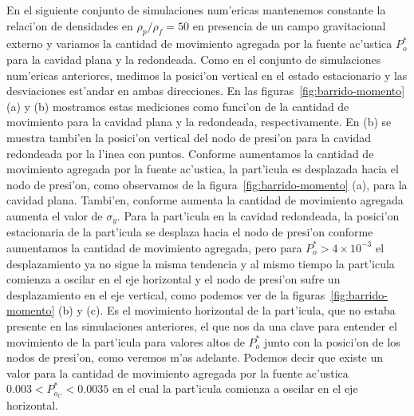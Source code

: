 En el siguiente conjunto de simulaciones num'ericas mantenemos constante la
relaci'on de densidades en  $\rho_p/\rho_f=50$  en presencia de un campo
gravitacional externo y variamos la cantidad de movimiento
agregada por la fuente ac'ustica $P_o^\ast$  para la cavidad plana y
la redondeada. Como en el conjunto de simulaciones num'ericas anteriores, medimos
la posici'on vertical en el estado estacionario y las desviaciones est'andar en ambas direcciones.
En las figuras~\ref{fig:barrido-momento} (a) y (b) mostramos estas mediciones 
como funci'on de la cantidad de movimiento para la cavidad plana y la redondeada, respectivamente. 
En (b) se muestra tambi'en la posici'on vertical del nodo de presi'on para la cavidad redondeada
por la l'inea con puntos. Conforme aumentamos la cantidad de movimiento agregada 
por la fuente ac'ustica, la part'icula es desplazada hacia el nodo de presi'on, 
como observamos de la figura~\ref{fig:barrido-momento} (a), para
la cavidad plana. Tambi'en, conforme aumenta la cantidad de movimiento agregada aumenta
el valor de $\sigma_y$.  Para la part'icula en la cavidad redondeada,  la posici'on estacionaria de la part'icula
se desplaza hacia el nodo de presi'on conforme aumentamos la cantidad de movimiento
agregada, pero para $P_{o}^\ast > 4\times 10^{-3}$ el desplazamiento ya no sigue la misma tendencia
y al mismo tiempo la part'icula comienza a oscilar  en el eje horizontal y el nodo de presi'on
sufre un desplazamiento en el eje vertical, como podemos
ver de la figuras~\ref{fig:barrido-momento} (b) y (c).
Es el movimiento horizontal de la part'icula, que no estaba presente en las
simulaciones anteriores, el que nos da una clave para entender el movimiento de la part'icula
para valores altos de $P_o^\ast$ junto con la posici'on de los nodos de presi'on, 
como veremos m'as adelante. Podemos decir que existe un valor para la cantidad de 
movimiento agregada por la fuente ac'ustica  $0.003 < P_{o_C}^\ast < 0.0035$ en el cual la part'icula
comienza a oscilar en el eje horizontal.



